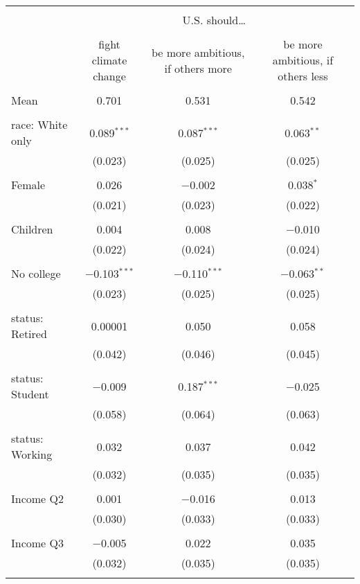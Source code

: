 
\begin{tabular}{@{\extracolsep{5pt}}lccc} 
\\[-1.8ex]\hline 
\hline \\[-1.8ex] 
 & \multicolumn{3}{c}{U.S. should… } \\ 
\cline{2-4} 
\\[-1.8ex] & fight climate change & be more ambitious, if others more & be more ambitious, if others less \\ 
\hline \\[-1.8ex] 
 Mean & 0.701 & 0.531 & 0.542  \\ \hline \\[-1.8ex] race: White only & 0.089$^{***}$ & 0.087$^{***}$ & 0.063$^{**}$ \\ 
  & (0.023) & (0.025) & (0.025) \\ 
  & & & \\ 
 Female & 0.026 & $-$0.002 & 0.038$^{*}$ \\ 
  & (0.021) & (0.023) & (0.022) \\ 
  & & & \\ 
 Children & 0.004 & 0.008 & $-$0.010 \\ 
  & (0.022) & (0.024) & (0.024) \\ 
  & & & \\ 
 No college & $-$0.103$^{***}$ & $-$0.110$^{***}$ & $-$0.063$^{**}$ \\ 
  & (0.023) & (0.025) & (0.025) \\ 
  & & & \\ 
 status: Retired & 0.00001 & 0.050 & 0.058 \\ 
  & (0.042) & (0.046) & (0.045) \\ 
  & & & \\ 
 status: Student & $-$0.009 & 0.187$^{***}$ & $-$0.025 \\ 
  & (0.058) & (0.064) & (0.063) \\ 
  & & & \\ 
 status: Working & 0.032 & 0.037 & 0.042 \\ 
  & (0.032) & (0.035) & (0.035) \\ 
  & & & \\ 
 Income Q2 & 0.001 & $-$0.016 & 0.013 \\ 
  & (0.030) & (0.033) & (0.033) \\ 
  & & & \\ 
 Income Q3 & $-$0.005 & 0.022 & 0.035 \\ 
  & (0.032) & (0.035) & (0.035) \\ 
  & & & \\ 

\end{tabular}

